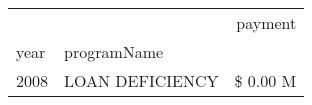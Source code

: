 \begin{tabular}{llr}
\toprule
 &  & payment \\
year & programName &  \\
\midrule
2008 & LOAN DEFICIENCY & \$ 0.00 M \\
\cline{1-3}
\bottomrule
\end{tabular}
